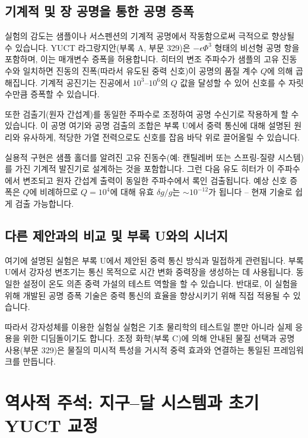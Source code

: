 \documentclass[11pt,a4paper]{article}
\begin{document}
	\subsection{기계적 및 장 공명을 통한 공명 증폭}
	\label{subsec:resonant-enhancement}
	
	실험의 감도는 샘플이나 서스펜션의 기계적 공명에서 작동함으로써 극적으로 향상될 수 있습니다. YUCT 라그랑지안(부록 A, 부문 329)은 $-\epsilon \Phi^3$ 형태의 비선형 공명 항을 포함하며, 이는 매개변수 증폭을 허용합니다. 히터의 변조 주파수가 샘플의 고유 진동수와 일치하면 진동의 진폭(따라서 유도된 중력 신호)이 공명의 품질 계수 $Q$에 의해 곱해집니다. 기계적 공진기는 진공에서 $10^3$–$10^6$의 $Q$ 값을 달성할 수 있어 신호를 수 자릿수만큼 증폭할 수 있습니다.
	
	또한 검출기(원자 간섭계)를 동일한 주파수로 조정하여 공명 수신기로 작용하게 할 수 있습니다. 이 공명 여기와 공명 검출의 조합은 부록 U에서 중력 통신에 대해 설명된 원리와 유사하게, 적당한 가열 전력으로도 신호를 잡음 바닥 위로 끌어올릴 수 있습니다.
	
	실용적 구현은 샘플 홀더를 알려진 고유 진동수(예: 캔틸레버 또는 스프링-질량 시스템)를 가진 기계적 발진기로 설계하는 것을 포함합니다. 그런 다음 유도 히터가 이 주파수에서 변조되고 원자 간섭계 출력이 동일한 주파수에서 록인 검출됩니다. 예상 신호 증폭은 $Q$에 비례하므로 $Q = 10^4$에 대해 유효 $\delta g/g$는 $\sim 10^{-12}$가 됩니다 – 현재 기술로 쉽게 검출 가능합니다.
	
	\subsection{다른 제안과의 비교 및 부록 U와의 시너지}
	\label{subsec:comparison-appU}
	
	여기에 설명된 실험은 부록 U에서 제안된 중력 통신 방식과 밀접하게 관련됩니다. 부록 U에서 강자성 변조기는 통신 목적으로 시간 변화 중력장을 생성하는 데 사용됩니다. 동일한 설정이 온도 의존 중력 가설의 테스트 역할을 할 수 있습니다. 반대로, 이 실험을 위해 개발된 공명 증폭 기술은 중력 통신의 효율을 향상시키기 위해 직접 적용될 수 있습니다.
	
	따라서 강자성체를 이용한 실험실 실험은 기초 물리학의 테스트일 뿐만 아니라 실제 응용을 위한 디딤돌이기도 합니다. 조정 화학(부록 C)에 의해 안내된 물질 선택과 공명 사용(부문 329)은 물질의 미시적 특성을 거시적 중력 효과와 연결하는 통일된 프레임워크를 만듭니다.
	
	\section{역사적 주석: 지구–달 시스템과 초기 YUCT 교정}
	\label{sec:earth-moon}
	
\end{document}
